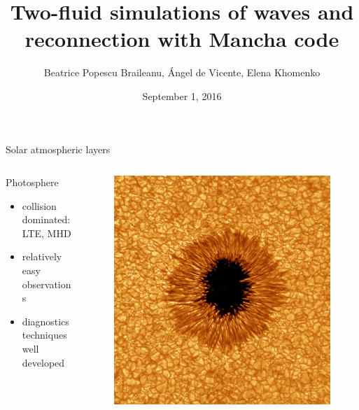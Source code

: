 \documentclass{beamer}
\begin{document}
\title[Two-fluid simulations]  
{Two-fluid simulations of waves and reconnection with Mancha code}
\author[]{Beatrice Popescu Braileanu, \'Angel de Vicente, Elena Khomenko }
\date{September 1, 2016}

\begin{frame}
\maketitle
\end{frame}

\begin{frame}[t]{Solar atmospheric layers}
\vspace*{-22pt}
\begin{columns}[b]
    \begin{column}{0.6\textwidth}
		Photosphere
        \begin{itemize}
					\item collision dominated: LTE, MHD 
					\item	relatively easy observations 
					\item	diagnostics techniques well developed 
        \end{itemize}
    \end{column}
    
    \begin{column}{0.5\textwidth}
			\begin{figure}[t]
			 \includegraphics[scale=0.08]{phot.jpg}
			\end{figure}
    \end{column}
\end{columns} 


\end{frame}
\end{document}
